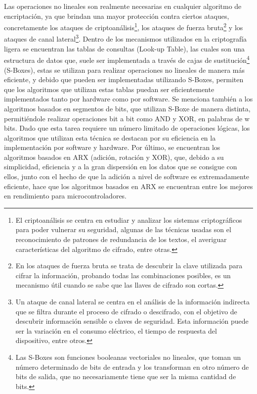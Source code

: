 \documentclass[a4paper,10pt]{article}
\begin{document}
	Las operaciones no lineales son realmente necesarias en cualquier algoritmo de encriptación, ya que brindan una mayor protección contra ciertos ataques, concretamente los ataques de criptoanálisis\footnote{El criptoanálisis se centra en estudiar y analizar los sistemas criptográficos para poder vulnerar su seguridad, algunas de las técnicas usadas son el reconocimiento de patrones de redundancia de los textos, el averiguar características del algoritmo de cifrado, entre otras.}, los ataques de fuerza bruta\footnote{En los ataques de fuerza bruta se trata de descubrir la clave utilizada para cifrar la información, probando todas las combinaciones posibles, es un mecanismo útil cuando se sabe que las llaves de cifrado son cortas.} y los ataques de canal lateral\footnote{Un ataque de canal lateral se centra en el análisis de la información indirecta que se filtra durante el proceso de cifrado o descifrado, con el objetivo de descubrir información sensible o claves de seguridad. Esta información puede ser la variación en el consumo eléctrico, el tiempo de respuesta del dispositivo, entre otros.}. Dentro de los mecanismos utilizados en la criptografía ligera se encuentran las tablas de consultas (Look-up Table), las cuales son una estructura de datos que, suele ser implementada a través de cajas de sustitución\footnote{Las S-Boxes son funciones booleanas vectoriales no lineales, que toman un número determinado de bits de entrada y los transforman en otro número de bits de salida, que no necesariamente tiene que ser la misma cantidad de bits.} (S-Boxes), estas se utilizan para realizar operaciones no lineales de manera más eficiente, y debido que pueden ser implementadas utilizando S-Boxes, permiten que los algoritmos que utilizan estas tablas puedan ser eficientemente implementados tanto por hardware como por software. Se menciona también a los algoritmos basados en segmentos de bits, que utilizan S-Boxe de manera distinta, permitiéndole realizar operaciones bit a bit como AND y XOR, en palabras de w bits. Dado que esta tarea requiere un número limitado de operaciones lógicas, los algoritmos que utilizan esta técnica se destacan por su eficiencia en la implementación por software y hardware. Por último, se encuentran los algoritmos basados en ARX (adición, rotación y XOR), que, debido a su simplicidad, eficiencia y a la gran dispersión en los datos que se consigue con ellos, junto con el hecho de que la adición a nivel de software es extremadamente eficiente, hace que los algoritmos basados en ARX se encuentran entre los mejores en rendimiento para microcontroladores.
	
\end{document}
